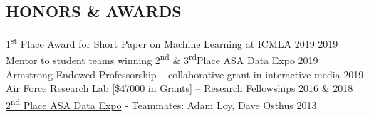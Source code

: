 \documentclass[margin, 10pt]{res}\usepackage[]{graphicx}\usepackage[]{color}
\begin{document}
\begin{resume}
\section{HONORS \& AWARDS}
1\textsuperscript{st} Place Award for Short \href{https://kmaurer.github.io/documents/papers/MaurerBennetteICMLA.pdf}{Paper} on Machine Learning at \href{https://www.icmla-conference.org/icmla19/}{ICMLA 2019} \hfill 2019\\
Mentor to student teams winning {2\textsuperscript{nd} \& 3\textsuperscript{rd}Place ASA Data Expo} \hfill 2019\\
Armstrong Endowed Professorship -- collaborative grant in interactive media \hfill 2019 \\
Air Force Research Lab [\$47000 in Grants] -- Research Fellowships \hfill 2016 \& 2018\\
\href{http://stat-computing.org/dataexpo/2013/}{2\textsuperscript{nd} Place ASA Data Expo} - Teammates: Adam Loy, Dave Osthus \hfill 2013 

\end{resume}
\end{document}
